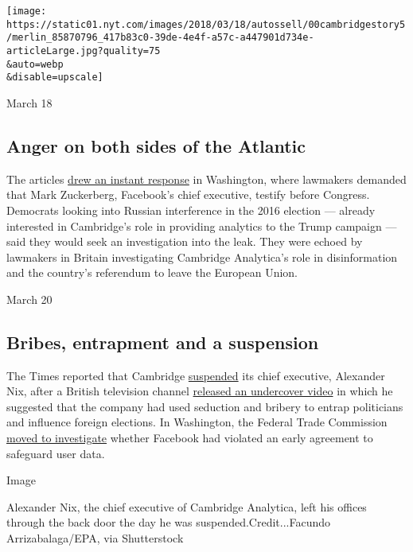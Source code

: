 \texttt{[image: https://static01.nyt.com/images/2018/03/18/autossell/00cambridgestory5/merlin\_85870796\_417b83c0-39de-4e4f-a57c-a447901d734e-articleLarge.jpg?quality=75\\\&auto=webp\\\&disable=upscale]}

March 18

\hypertarget{anger-on-both-sides-of-the-atlantic}{%
\subsection{Anger on both sides of the
Atlantic}\label{anger-on-both-sides-of-the-atlantic}}

The articles
\href{https://www.nytimes.com/2018/03/18/us/cambridge-analytica-facebook-privacy-data.html}{drew
an instant response} in Washington, where lawmakers demanded that Mark
Zuckerberg, Facebook's chief executive, testify before Congress.
Democrats looking into Russian interference in the 2016 election ---
already interested in Cambridge's role in providing analytics to the
Trump campaign --- said they would seek an investigation into the leak.
They were echoed by lawmakers in Britain investigating Cambridge
Analytica's role in disinformation and the country's referendum to leave
the European Union.

March 20

\hypertarget{bribes-entrapment-and-a-suspension}{%
\subsection{Bribes, entrapment and a
suspension}\label{bribes-entrapment-and-a-suspension}}

The Times reported that Cambridge
\href{https://www.nytimes.com/2018/03/20/world/europe/cambridge-analytica-ceo-suspended.html}{suspended}
its chief executive, Alexander Nix, after a British television channel
\href{https://www.nytimes.com/2018/03/19/us/cambridge-analytica-alexander-nix.html}{released
an undercover video} in which he suggested that the company had used
seduction and bribery to entrap politicians and influence foreign
elections. In Washington, the Federal Trade Commission
\href{https://www.nytimes.com/2018/03/20/business/ftc-facebook-privacy-investigation.html}{moved
to investigate} whether Facebook had violated an early agreement to
safeguard user data.

Image

Alexander Nix, the chief executive of Cambridge Analytica, left his
offices through the back door the day he was suspended.Credit...Facundo
Arrizabalaga/EPA, via Shutterstock

